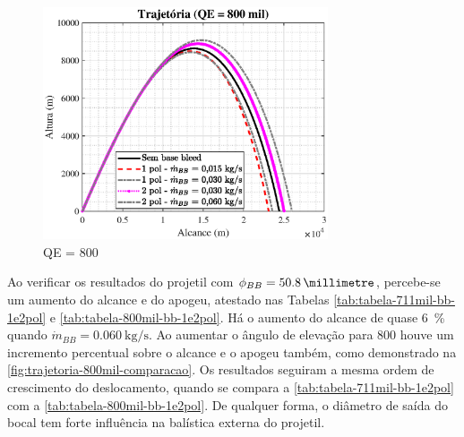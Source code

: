\begin{figure}[!htpb]
	\centering
    \includegraphics[width=0.75\textwidth]{foto2-qe800mil-comparacao.eps}
    \caption[QE = \qty{800}{\milliradian} \(\left(\phi_{BB} = \qty{25,4}{\millimetre}\right)\)]{QE = \qty{800}{\milliradian}}
    \label{fig:trajetoria-800mil-comparacao}
\end{figure}

Ao verificar os resultados do projetil com \(\phi_{BB} = \qty{50,8}{\millimetre}\), percebe-se um aumento do alcance e do apogeu, atestado nas Tabelas \ref{tab:tabela-711mil-bb-1e2pol} e \ref{tab:tabela-800mil-bb-1e2pol}. Há o aumento do alcance de quase \qty{6}{\percent} quando \(\Dot{m}_{BB} = \qty{0,060}{\kilogram\per\second}\). Ao aumentar o ângulo de elevação para \qty{800}{\milliradian} houve um incremento percentual sobre o alcance e o apogeu também, como demonstrado na \autoref{fig:trajetoria-800mil-comparacao}. Os resultados seguiram a mesma ordem de crescimento do deslocamento, quando se compara a \autoref{tab:tabela-711mil-bb-1e2pol} com a \autoref{tab:tabela-800mil-bb-1e2pol}. De qualquer forma, o diâmetro de saída do bocal tem forte influência na balística externa do projetil.

